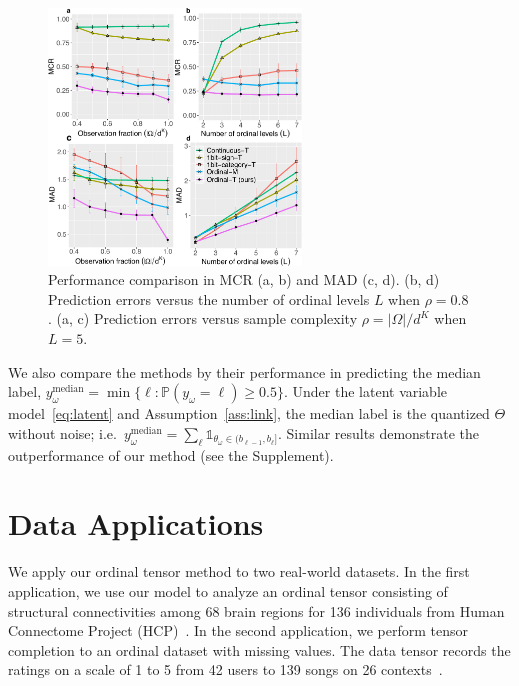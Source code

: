 \documentclass[11pt]{article}
\theoremstyle{plain}
\theoremstyle{definition}
\begin{document}
\begin{figure}[t]
  \centering
\includegraphics[width=0.6\textwidth]{panel2.pdf}
\caption{Performance comparison in MCR (a, b) and MAD (c, d). (b, d) Prediction errors versus the number of ordinal levels $L$ when $\rho=0.8$. (a, c) Prediction errors versus sample complexity $\rho=|\Omega|/d^K$ when $L=5$. }\label{fig:compare}
\end{figure}


We also compare the methods by their performance in predicting the median label, $y_\omega^{\text{median}}=\min\{\ell\colon\mathbb{P}(y_\omega=\ell)\geq 0.5\}$. Under the latent variable model~\eqref{eq:latent} and Assumption~\ref{ass:link}, the median label is the quantized $\Theta$ without noise; i.e.\ $y_\omega^{\text{median}}=\sum_\ell \mathds{1}_{\theta_\omega\in(b_{\ell-1},b_\ell]}$. Similar results demonstrate the outperformance of our method (see the Supplement).

\section{Data Applications}
We apply our ordinal tensor method to two real-world datasets. In the first application, we use our model to analyze an ordinal tensor consisting of structural connectivities among 68 brain regions for 136 individuals from Human Connectome Project (HCP)~\citep{geddes2016human}. In the second application, we perform tensor completion to an ordinal dataset with missing values. The data tensor records the ratings on a scale of 1 to 5 from 42 users to 139 songs on 26 contexts~\citep{baltrunas2011incarmusic}.
\end{document}
